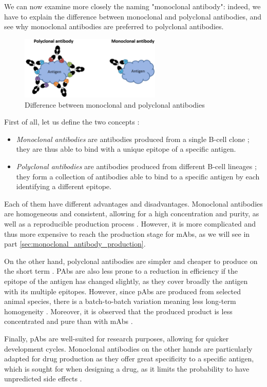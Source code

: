 We can now examine more closely the naming "monoclonal antibody": indeed, we
have to explain the difference between monoclonal and polyclonal antibodies,
and see why monoclonal antibodies are preferred to polyclonal antibodies.

\begin{figure}[H]       
    \centering
    \includegraphics[width=0.6\textwidth]{../Images/Monoclonal_and_Polyclonal_Antibodies.png}   
    \caption{Difference between monoclonal and polyclonal antibodies}
    \label{fig:Monoclonal_and_Polyclonal_Antibodies}
\end{figure}

First of all, let us define the two concepts :

\begin{itemize}
    \item \emph{Monoclonal antibodies} are antibodies produced from a single B-cell
    clone ; they are thus able to bind with a unique epitope of a specific antigen.
    \item \emph{Polyclonal antibodies} are antibodies produced from different B-cell
    lineages ; they form a collection of antibodies able to bind to a specific antigen
    by each identifying a different epitope.
\end{itemize}

Each of them have different advantages and disadvantages. Monoclonal antibodies
are homogeneous and consistent, allowing for a high concentration and purity,
as well as a reproducible production process \cite{lipman_monoclonal_2005}.
However, it is more complicated and thus more expensive to reach the production 
stage for mAbs, as we will see in part \ref{sec:monoclonal_antibody_production}.

On the other hand, polyclonal antibodies are simpler and cheaper to produce
on the short term \cite{nelson_monoclonal_2000}. PAbs are also less prone to
a reduction in efficiency if the epitope of the antigen has changed slightly,
as they cover broadly the antigen with its multiple epitopes. However, since
pAbs are produced from selected animal species, there is a batch-to-batch
variation meaning less long-term homogeneity \cite{nelson_monoclonal_2000}.
Moreover, it is observed that the produced product is less concentrated and
pure than with mAbs \cite{lipman_monoclonal_2005}.

Finally, pAbs are well-suited for research purposes, allowing for quicker
development cycles. Monoclonal antibodies on the other hands are particularly
adapted for drug production as they offer great specificity to a specific antigen,
which is sought for when designing a drug, as it limits the probability to
have unpredicted side effects \cite{breedveld_therapeutic_2000}.
